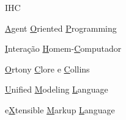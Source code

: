 \begin{listofabbrv}{IHC}
		\item[AOP] \underline{A}gent \underline{O}riented \underline{P}rogramming
        \item[IHC] \underline{I}ntera\c{c}\~{a}o \underline{H}omem-\underline{C}omputador
        \item[OCC] \underline{O}rtony \underline{C}lore e \underline{C}ollins
        \item[UML] \underline{U}nified \underline{M}odeling \underline{L}anguage
        \item[XML] e\underline{X}tensible \underline{M}arkup \underline{L}anguage
\end{listofabbrv}

